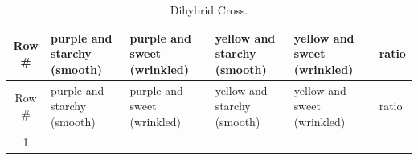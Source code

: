 \documentclass[]{book}
\theoremstyle{definition}
\theoremstyle{definition}
\theoremstyle{definition}
\theoremstyle{remark}
\begin{document}
\begin{longtable}[]{@{}clllll@{}}
\caption{\label{tab:di} Dihybrid Cross.}\tabularnewline
\toprule
\begin{minipage}[b]{0.05\columnwidth}\centering\strut
Row \#\strut
\end{minipage} & \begin{minipage}[b]{0.19\columnwidth}\raggedright\strut
purple and starchy (smooth)\strut
\end{minipage} & \begin{minipage}[b]{0.19\columnwidth}\raggedright\strut
purple and sweet (wrinkled)\strut
\end{minipage} & \begin{minipage}[b]{0.19\columnwidth}\raggedright\strut
yellow and starchy (smooth)\strut
\end{minipage} & \begin{minipage}[b]{0.19\columnwidth}\raggedright\strut
yellow and sweet (wrinkled)\strut
\end{minipage} & \begin{minipage}[b]{0.04\columnwidth}\raggedright\strut
ratio\strut
\end{minipage}\tabularnewline
\midrule
\endfirsthead
\toprule
\begin{minipage}[b]{0.05\columnwidth}\centering\strut
Row \#\strut
\end{minipage} & \begin{minipage}[b]{0.19\columnwidth}\raggedright\strut
purple and starchy (smooth)\strut
\end{minipage} & \begin{minipage}[b]{0.19\columnwidth}\raggedright\strut
purple and sweet (wrinkled)\strut
\end{minipage} & \begin{minipage}[b]{0.19\columnwidth}\raggedright\strut
yellow and starchy (smooth)\strut
\end{minipage} & \begin{minipage}[b]{0.19\columnwidth}\raggedright\strut
yellow and sweet (wrinkled)\strut
\end{minipage} & \begin{minipage}[b]{0.04\columnwidth}\raggedright\strut
ratio\strut
\end{minipage}\tabularnewline
\midrule
\endhead
\begin{minipage}[t]{0.05\columnwidth}\centering\strut
1\strut
\end{minipage} & \begin{minipage}[t]{0.19\columnwidth}\raggedright\strut

\end{minipage}
\end{longtable}
\end{document}
